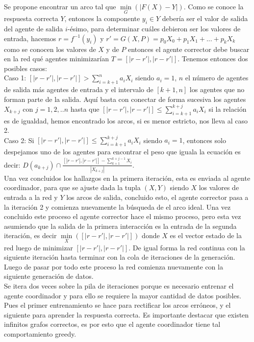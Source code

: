 \documentclass{article}
\begin{document}
        Se propone encontrar un arco tal que $\underset{G}{\min}(|F(X)-Y|)$. Como se conoce la respuesta correcta $Y$, entonces la componente $y_i \in Y$ debería ser el valor de salida del agente de salida $i$-ésimo, para determinar cuáles debieron ser los valores de entrada, hacemos $r=f^{-1}(y_i)$ y $r'=G(X,P)=p_0X_0 + p_1X_1 +...+p_kX_k$ como se conocen los valores de $X$ y de $P$ 
        entonces el agente corrector debe buscar en la red qué agentes minimizarían $T=[|r-r'|,|r-r'|]$. Tenemos entonces dos posibles casos: \\
        
        Caso 1: $[|r-r'|,|r-r'|] > \sum_{i=k+1}^{n} a_iX_i$ siendo $a_i=1$, $n$ el número de agentes de salida más agentes de entrada y el intervalo de $[k+1,n]$ los agentes
        que no forman parte de la salida. Aquí basta con conectar de forma sucesiva los agentes $X_{k+j}$ con $j=1,2,..n$ hasta que $[|r-r'|,|r-r'|] \leqslant \sum_{i=k+1}^{k+j} a_iX_i$ si la relación es de igualdad, hemos encontrado los arcos,
         si es menor estricto, nos lleva al caso 2.\\

        Caso 2: Si $[|r-r'|,|r-r'|] \leqslant \sum_{i=k+1}^{k+j} a_iX_i$ siendo $a_i=1$, entonces solo despejamos uno de los agentes para encontrar el peso que iguala la ecuación
        es decir: $D(a_{k+j}) \cap \frac{[|r-r'|,|r-r'|] - \sum_{k+1}^{k+j-1} X_i}{|X_{k+j}|}$.\\

        Una vez concluidos los hallazgos en la primera iteración, esta es enviada al agente coordinador, para que se ajuste dada la tupla $(X,Y)$ siendo 
        $X$ los valores de entrada a la red y $Y$ los arcos de salida, concluido esto, el agente corrector pasa a la iteración 2 y comienza nuevamente la búsqueda de el arco ideal. Una vez concluido este proceso 
        el agente corrector hace el mismo proceso, pero esta vez asumiendo que la salida de la primera interacción es la entrada de la segunda iteración, es decir $\underset{X}{\min}([|r-r'|,|r-r'|])$ donde $X$ es el vector estado de la red luego de minimizar $[|r-r'|,|r-r'|]$. 
        De igual forma la red continua con la siguiente iteración hasta terminar con la cola de iteraciones de la generación. Luego de pasar por todo este proceso la red comienza nuevamente con la siguiente generación de datos. \\

        Se itera dos veces sobre la pila de iteraciones porque es necesario entrenar el agente coordinador y para ello se requiere la mayor cantidad de datos posibles. Pues el primer entrenamiento se hace para rectificar los arcos erróneos, y el siguiente para aprender la respuesta correcta. 
        Es importante destacar que existen infinitos grafos correctos, es por esto que el agente coordinador tiene tal comportamiento greedy.
\end{document}
